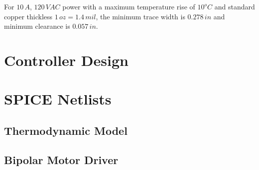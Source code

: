 \documentclass[10pt, twocolumn]{article}
\begin{document}
For $10\,A$, $120\,VAC$ power with a maximum temperature rise of $10^{o}C$
and standard copper thickless $1\,oz=1.4\,mil$, the minimum trace width
is $0.278\,in$ and minimum clearance is $0.057\,in$.

\section{Controller Design}

\appendix

\section{SPICE Netlists}

\subsection{Thermodynamic Model}
\label{heat-model-listing}


\subsection{Bipolar Motor Driver}
\label{motor-driver-listing}

\end{document}
